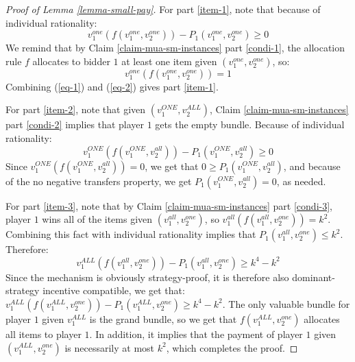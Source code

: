 \begin{proof}[Proof of Lemma \ref{lemma-small-pay}]
For part \ref{item-1}, note that because of individual rationality:
\begin{equation}\label{eq-1}
 v_1^{one}(f(v_1^{one},v_2^{one}))-P_1(v_1^{one},v_2^{one})\ge 0   
\end{equation}
We remind that by Claim \ref{claim-mua-sm-instances} part \ref{condi-1}, the allocation rule $f$ allocates to bidder $1$ at least one item given $(v_1^{one},v_2^{one})$, so:
\begin{equation}\label{eq-2}
 v_1^{one}(f(v_1^{one},v_2^{one}))=1   
\end{equation}
Combining (\ref{eq-1}) and (\ref{eq-2}) gives part \ref{item-1}.



For part \ref{item-2}, note that given $(v_1^{ONE},v_2^{ALL})$, Claim \ref{claim-mua-sm-instances} part \ref{condi-2} implies that
player $1$ gets the empty bundle. Because of individual rationality: 
$$v_1^{ONE}(f(v_1^{ONE},v_2^{all}))-P_1(v_1^{ONE},v_2^{all})\ge 0 $$
Since $v_1^{ONE}(f(v_1^{ONE},v_2^{all}))=0$, we get that $0\ge P_1(v_1^{ONE},v_2^{all})$, and because of the no negative transfers property, we get $P_1(v_1^{ONE},v_2^{all})=0$, as needed.

For part \ref{item-3}, note that by Claim \ref{claim-mua-sm-instances} part \ref{condi-3}, player $1$ wins all of the items given $(v_1^{all},v_2^{one})$, so $v_1^{all}(f(v_1^{all},v_2^{one}))=k^2$. Combining this fact with individual rationality implies that $P_1(v_1^{all},v_2^{one})\le k^2$. Therefore:
\begin{equation*}
    v_1^{ALL}(f(v_1^{all},v_2^{one}))-P_1(v_1^{all},v_2^{one})\ge k^4 - k^2
\end{equation*}
Since the mechanism is obviously strategy-proof, it is therefore also dominant-strategy incentive compatible, we get that: $    v_1^{ALL}(f(v_1^{ALL},v_2^{one}))-P_1(v_1^{ALL},v_2^{one})\ge k^4 - k^2
$. The only valuable bundle for player $1$ given $v_1^{ALL}$ is the grand bundle, so we get that 
$f(v_1^{ALL},v_2^{one})$ allocates all items to player $1$. In addition, it implies that the payment of player $1$ given $(v_1^{ALL},v_2^{one})$ is necessarily at most $k^2$, which completes the proof. \qedhere

\end{proof}

